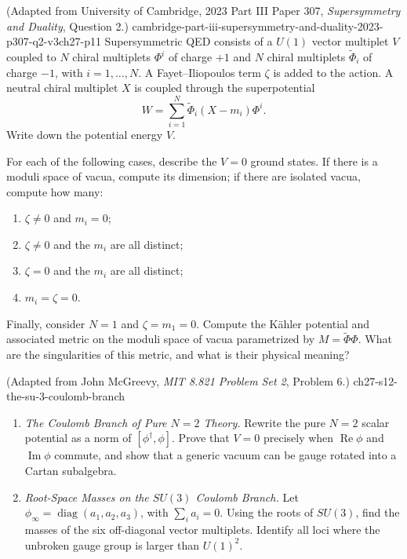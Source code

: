 \begin{enumerate}
    {(Adapted from University of Cambridge, 2023 Part III Paper 307, \emph{Supersymmetry and Duality}, Question 2.)}
    {cambridge-part-iii-supersymmetry-and-duality-2023-p307-q2-v3ch27-p11}
Supersymmetric QED consists of a \(U(1)\) vector multiplet \(V\) coupled
  to \(N\) chiral multiplets \(\Phi^i\) of charge \(+1\) and \(N\) chiral
  multiplets \(\widetilde\Phi_i\) of charge \(-1\), with
  \(i=1,\ldots,N\).  A Fayet--Iliopoulos term \(\zeta\) is added to the
  action.  A neutral chiral multiplet \(X\) is coupled through the
  superpotential
  \[
    W=\sum_{i=1}^N\widetilde\Phi_i(X-m_i)\Phi^i.
  \]
  Write down the potential energy \(V\).

  For each of the following cases, describe the \(V=0\) ground states.  If
  there is a moduli space of vacua, compute its dimension; if there are
  isolated vacua, compute how many:
  \begin{enumerate}
    \item[(i)] \(\zeta\ne0\) and \(m_i=0\);
    \item[(ii)] \(\zeta\ne0\) and the \(m_i\) are all distinct;
    \item[(iii)] \(\zeta=0\) and the \(m_i\) are all distinct;
    \item[(iv)] \(m_i=\zeta=0\).
  \end{enumerate}
  Finally, consider \(N=1\) and \(\zeta=m_1=0\).  Compute the K\"ahler
  potential and associated metric on the moduli space of vacua parametrized
  by \(M=\widetilde\Phi\Phi\).  What are the singularities of this metric,
  and what is their physical meaning?

    {(Adapted from John McGreevy, \emph{MIT 8.821 Problem Set 2}, Problem 6.)}
    {ch27-s12-the-su-3-coulomb-branch}
  \begin{enumerate}
    \item \emph{The Coulomb Branch of Pure \(N=2\) Theory.}
    Rewrite the pure \(N=2\) scalar potential as a norm of
      \([\phi^\dagger,\phi]\).  Prove that \(V=0\) precisely when
      \(\operatorname{Re}\phi\) and \(\operatorname{Im}\phi\) commute, and
      show that a generic vacuum can be gauge rotated into a Cartan subalgebra.
    \item \emph{Root-Space Masses on the \(SU(3)\) Coulomb Branch.}
    Let
      \(\phi_\infty=\operatorname{diag}(a_1,a_2,a_3)\), with
      \(\sum_i a_i=0\).  Using the roots of \(SU(3)\), find the masses of the
      six off-diagonal vector multiplets.  Identify all loci where the
      unbroken gauge group is larger than \(U(1)^2\).
  \end{enumerate}


\end{enumerate}
